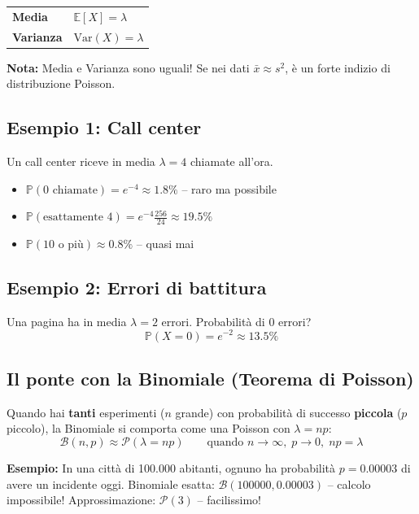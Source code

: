 \documentclass[a4paper,11pt]{article}
\newcommand{\PP}{\mathbb{P}}
\newcommand{\E}{\mathbb{E}}
\begin{document}
\begin{center}
\begin{tabular}{ll}
\toprule
\textbf{Media} & $\E[X] = \lambda$ \\
\textbf{Varianza} & $\text{Var}(X) = \lambda$ \\
\bottomrule
\end{tabular}
\end{center}

\textbf{Nota:} Media e Varianza sono uguali! Se nei dati $\bar{x} \approx s^2$, è un forte indizio di distribuzione Poisson.

\subsection*{Esempio 1: Call center}
Un call center riceve in media $\lambda = 4$ chiamate all'ora.
\begin{itemize}[nosep]
    \item $\PP(\text{0 chiamate}) = e^{-4} \approx 1.8\%$ -- raro ma possibile
    \item $\PP(\text{esattamente 4}) = e^{-4} \frac{256}{24} \approx 19.5\%$
    \item $\PP(\text{10 o più}) \approx 0.8\%$ -- quasi mai
\end{itemize}

\subsection*{Esempio 2: Errori di battitura}
Una pagina ha in media $\lambda = 2$ errori. Probabilità di 0 errori?
\[ \PP(X=0) = e^{-2} \approx 13.5\% \]

\subsection*{Il ponte con la Binomiale (Teorema di Poisson)}

Quando hai \textbf{tanti} esperimenti ($n$ grande) con probabilità di successo \textbf{piccola} ($p$ piccolo), la Binomiale si comporta come una Poisson con $\lambda = np$:
\[
\mathcal{B}(n, p) \approx \mathcal{P}(\lambda = np) \qquad \text{quando } n \to \infty, \; p \to 0, \; np = \lambda
\]

\textbf{Esempio:} In una città di 100.000 abitanti, ognuno ha probabilità $p = 0.00003$ di avere un incidente oggi. Binomiale esatta: $\mathcal{B}(100000, 0.00003)$ -- calcolo impossibile! Approssimazione: $\mathcal{P}(3)$ -- facilissimo!
\end{document}
